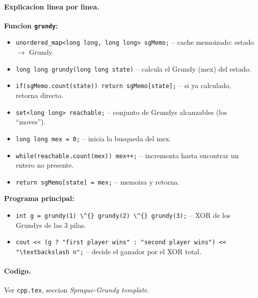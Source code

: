 \paragraph{Explicacion linea por linea.}
\textbf{Funcion \texttt{grundy}:}
\begin{itemize}\setlength\itemsep{0pt}
	\item \verb|unordered_map<long long, long long> sgMemo;| -- cache memoizado: estado $\to$ Grundy.
	\item \verb|long long grundy(long long state)| -- calcula el Grundy (mex) del estado.
	\item \verb|if(sgMemo.count(state)) return sgMemo[state];| -- si ya calculado, retorna directo.
	\item \verb|set<long long> reachable;| -- conjunto de Grundys alcanzables (los ``moves'').
	\item \verb|long long mex = 0;| -- inicia la busqueda del mex.
	\item \verb|while(reachable.count(mex)) mex++;| -- incrementa hasta encontrar un entero no presente.
	\item \verb|return sgMemo[state] = mex;| -- memoiza y retorna.
\end{itemize}
\textbf{Programa principal:}
\begin{itemize}\setlength\itemsep{0pt}
	\item \verb|int g = grundy(1) \^{} grundy(2) \^{} grundy(3);| -- XOR de los Grundys de las 3 pilas.
	\item \verb|cout << (g ? "first player wins" : "second player wins") << "\textbackslash n";| -- decide el ganador por el XOR total.
\end{itemize}

\paragraph{Codigo.}
Ver \texttt{cpp.tex}, seccion \textit{Sprague-Grundy template}.

\vspace{0.5em|||}
